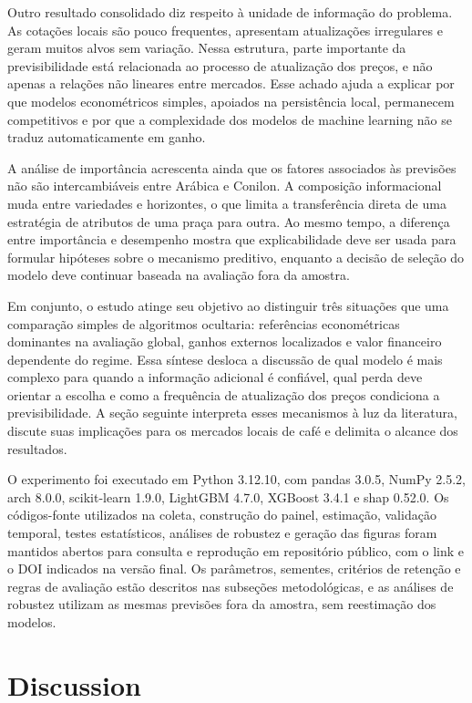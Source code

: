\documentclass[a4paper,fleqn]{cas-sc}
\begin{document}
Outro resultado consolidado diz respeito à unidade de informação do problema. As cotações locais são pouco frequentes, apresentam atualizações irregulares e geram muitos alvos sem variação. Nessa estrutura, parte importante da previsibilidade está relacionada ao processo de atualização dos preços, e não apenas a relações não lineares entre mercados. Esse achado ajuda a explicar por que modelos econométricos simples, apoiados na persistência local, permanecem competitivos e por que a complexidade dos modelos de machine learning não se traduz automaticamente em ganho.

A análise de importância acrescenta ainda que os fatores associados às previsões não são intercambiáveis entre Arábica e Conilon. A composição informacional muda entre variedades e horizontes, o que limita a transferência direta de uma estratégia de atributos de uma praça para outra. Ao mesmo tempo, a diferença entre importância e desempenho mostra que explicabilidade deve ser usada para formular hipóteses sobre o mecanismo preditivo, enquanto a decisão de seleção do modelo deve continuar baseada na avaliação fora da amostra.

Em conjunto, o estudo atinge seu objetivo ao distinguir três situações que uma comparação simples de algoritmos ocultaria: referências econométricas dominantes na avaliação global, ganhos externos localizados e valor financeiro dependente do regime. Essa síntese desloca a discussão de qual modelo é mais complexo para quando a informação adicional é confiável, qual perda deve orientar a escolha e como a frequência de atualização dos preços condiciona a previsibilidade. A seção seguinte interpreta esses mecanismos à luz da literatura, discute suas implicações para os mercados locais de café e delimita o alcance dos resultados.

O experimento foi executado em Python 3.12.10, com pandas 3.0.5, NumPy 2.5.2, arch 8.0.0, scikit-learn 1.9.0, LightGBM 4.7.0, XGBoost 3.4.1 e shap 0.52.0. Os códigos-fonte utilizados na coleta, construção do painel, estimação, validação temporal, testes estatísticos, análises de robustez e geração das figuras foram mantidos abertos para consulta e reprodução em repositório público, com o link e o DOI indicados na versão final. Os parâmetros, sementes, critérios de retenção e regras de avaliação estão descritos nas subseções metodológicas, e as análises de robustez utilizam as mesmas previsões fora da amostra, sem reestimação dos modelos.

\section{Discussion}
\label{sec:discussion}
\end{document}

